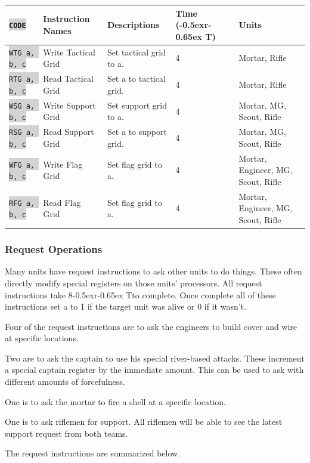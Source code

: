 \documentclass{article}
\newcommand{\vnscode}[1]{\colorbox{lightgray}{\lstinline[language=vns]{#1}}}
\newcommand{\RT}{\lower-0.5ex\hbox{r}\kern-0.65ex T}
\begin{document}
\begin{minipage}{\textwidth}
\label{table:grid}
\centering
\begin{tabular}{lllll}
    \hline \vnscode{CODE} & Instruction Names & Descriptions & Time (\RT) & Units \\ \hline
    \vnscode{WTG a, b, c} & Write Tactical Grid & Set tactical grid to a. & 4 & Mortar, Rifle \\
    \vnscode{RTG a, b, c} & Read Tactical Grid & Set a to tactical grid. & 4 & Mortar, Rifle \\
    \vnscode{WSG a, b, c} & Write Support Grid & Set support grid to a. & 4 & Mortar, MG, Scout, Rifle \\
    \vnscode{RSG a, b, c} & Read Support Grid & Set a to support grid. & 4 & Mortar, MG, Scout, Rifle \\
    \vnscode{WFG a, b, c} & Write Flag Grid & Set flag grid to a. & 4 & Mortar, Engineer, MG, Scout, Rifle \\
    \vnscode{RFG a, b, c} & Read Flag Grid & Set flag grid to a. & 4 & Mortar, Engineer, MG, Scout, Rifle \\
\end{tabular}
\end{minipage}

\subsubsection{Request Operations}

Many units have request instructions to ask other units to do things. These
often directly modify special registers on those units' processors. All request
instructions take 8\RT to complete. Once complete all of these instructions set
a to 1 if the target unit was alive or 0 if it wasn't.

Four of the request instructions are to ask the engineers to build cover and
wire at specific locations.

Two are to ask the captain to use his special river-based attacks. These
increment a special captain register by the immediate amount. This can be used
to ask with different amounts of forcefulness.

One is to ask the mortar to fire a shell at a specific location.

One is to ask riflemen for support. All riflemen will be able to see the latest
support request from both teams.

The request instructions are summarized below.
\end{document}
